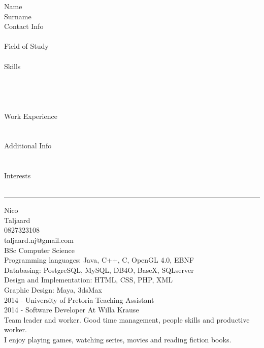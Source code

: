 \documentclass[letterpaper]{article}
\begin{document}
	\vspace*{0.2in}
	\begin{minipage}{0.26\linewidth}
		Name 			\\
		Surname			\\
		Contact Info 	\\
						\\
		Field of Study	\\
						\\
		Skills			\\
						\\
						\\
						\\
						\\
		Work Experience	\\
						\\
						\\
		Additional Info	\\
						\\
						\\
		Interests		\\
						\\
	\end{minipage}
	\begin{minipage}{0.02\linewidth}
		\rule{1pt}{250pt}
	\end{minipage}
	\begin{minipage}{0.85\linewidth}
		Nico \\
		Taljaard \\
		0827323108 \\
		taljaard.nj@gmail.com \\
		BSc Computer Science \\
		
		Programming languages: Java, C++, C, OpenGL 4.0, EBNF \\
		Databasing: PostgreSQL, MySQL, DB4O, BaseX, SQLserver \\
		Design and Implementation: HTML, CSS, PHP, XML \\ 
		Graphic Design: Maya, 3dsMax \\
		
		2014 - University of Pretoria Teaching Assistant \\
		2014 - Software Developer At Willa Krause \\
		
		Team leader and worker. Good time management, people skills and productive worker. \\
		
		I enjoy playing games, watching series, movies and reading fiction books. \\
	\end{minipage}
		
\end{document}
